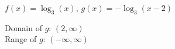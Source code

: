 {$f(x) = \log_{3}(x)$, $g(x) = -\log_{3}(x-2)$}
{Domain of $g$: $(2, \infty)$\\
 Range of $g$:  $(-\infty, \infty)$ \\
 
\begin{center}
\end{center}}

